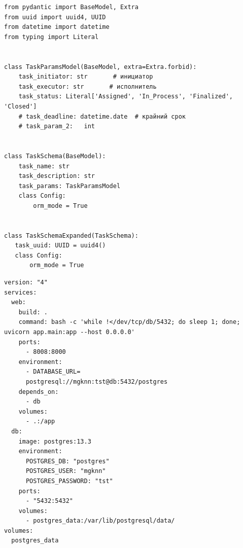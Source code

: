 \documentclass{altsu-report}
\begin{document}
\begin{code}
\label{code:pi-example}
\begin{verbatim}
from pydantic import BaseModel, Extra
from uuid import uuid4, UUID
from datetime import datetime
from typing import Literal


class TaskParamsModel(BaseModel, extra=Extra.forbid):
    task_initiator: str       # инициатор
    task_executor: str       # исполнитель
    task_status: Literal['Assigned', 'In_Process', 'Finalized', 'Closed']
    # task_deadline: datetime.date  # крайний срок
    # task_param_2:   int


class TaskSchema(BaseModel):
    task_name: str
    task_description: str
    task_params: TaskParamsModel
    class Config:
        orm_mode = True


class TaskSchemaExpanded(TaskSchema):
   task_uuid: UUID = uuid4()
   class Config:
       orm_mode = True
\end{verbatim}
\end{code}

\begin{code}
\label{code:pi-example}
\begin{verbatim}
version: "4"
services:
  web:
    build: .
    command: bash -c 'while !</dev/tcp/db/5432; do sleep 1; done; uvicorn app.main:app --host 0.0.0.0'
    ports:
      - 8008:8000
    environment:
      - DATABASE_URL=
      postgresql://mgknn:tst@db:5432/postgres
    depends_on:
      - db
    volumes:
      - .:/app
  db:
    image: postgres:13.3
    environment:
      POSTGRES_DB: "postgres"
      POSTGRES_USER: "mgknn"
      POSTGRES_PASSWORD: "tst"
    ports:
      - "5432:5432"
    volumes:
      - postgres_data:/var/lib/postgresql/data/
volumes:
  postgres_data
\end{verbatim}
\end{code}
\end{document}
